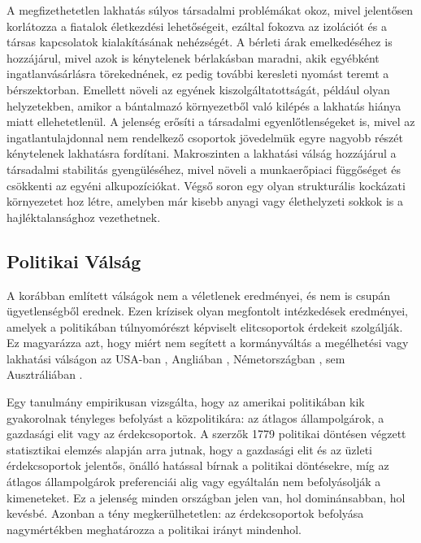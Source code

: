 
A megfizethetetlen lakhatás súlyos társadalmi problémákat okoz, mivel jelentősen korlátozza
a fiatalok életkezdési lehetőségeit, ezáltal fokozva az izolációt és a társas kapcsolatok
kialakításának nehézségét. A bérleti árak emelkedéséhez is hozzájárul, mivel azok
is kénytelenek bérlakásban maradni, akik egyébként ingatlanvásárlásra törekednének,
ez pedig további keresleti nyomást teremt a bérszektorban. Emellett növeli az egyének
kiszolgáltatottságát, például olyan helyzetekben, amikor a bántalmazó környezetből
való kilépés a lakhatás hiánya miatt ellehetetlenül. A jelenség erősíti a társadalmi
egyenlőtlenségeket is, mivel az ingatlantulajdonnal nem rendelkező csoportok jövedelmük
egyre nagyobb részét kénytelenek lakhatásra fordítani. Makroszinten a lakhatási válság
hozzájárul a társadalmi stabilitás gyengüléséhez, mivel növeli a munkaerőpiaci
függőséget és csökkenti az egyéni alkupozíciókat. Végső soron egy olyan strukturális
kockázati környezetet hoz létre, amelyben már kisebb anyagi vagy élethelyzeti sokkok is
a hajléktalansághoz vezethetnek.



\subsection{Politikai Válság}

A korábban említett válságok nem a véletlenek eredményei, és nem is csupán
ügyetlenségből erednek. Ezen krízisek olyan megfontolt intézkedések eredményei, amelyek
a politikában túlnyomórészt képviselt elitcsoportok érdekeit szolgálják. Ez magyarázza
azt, hogy miért nem segített a kormányváltás a megélhetési vagy lakhatási válságon az
USA-ban \cite{political_crisis_1, political_crisis_2}, Angliában \cite{political_crisis_3},
Németországban \cite{political_crisis_4, political_crisis_5}, sem Ausztráliában
\cite{political_crisis_6, political_crisis_7}.

Egy tanulmány \cite{political_crisis_8} empirikusan vizsgálta, hogy az amerikai politikában
kik gyakorolnak tényleges befolyást a közpolitikára: az átlagos állampolgárok, a gazdasági
elit vagy az érdekcsoportok. A szerzők 1779 politikai döntésen végzett statisztikai elemzés
alapján arra jutnak, hogy a gazdasági elit és az üzleti érdekcsoportok jelentős, önálló
hatással bírnak a politikai döntésekre, míg az átlagos állampolgárok preferenciái alig
vagy egyáltalán nem befolyásolják a kimeneteket. Ez a jelenség minden országban jelen
van, hol dominánsabban, hol kevésbé. Azonban a tény megkerülhetetlen: az érdekcsoportok
befolyása nagymértékben meghatározza a politikai irányt mindenhol.

